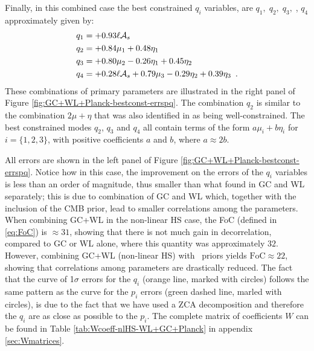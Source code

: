 Finally, in this combined case the best constrained $q_i$ variables, are $q_1,\;q_2,\;q_3,\;$, $q_4$ approximately given by:
\begin{equation} \label{eq:bestCombined-GCWLnonlinPlanck}
\begin{aligned}
	q_1  &= +0.93\ell \mathcal{A}_{s}\\            
	q_2  &= +0.84\mu_1 + 0.48\eta_1 \\ 
	q_3  &= +0.80\mu_2 - 0.26\eta_1 + 0.45 \eta_2\\
	q_4  &= +0.28\ell \mathcal{A}_{s} + 0.79\mu_3 - 0.29 \eta_2 + 0.39 \eta_3 \,\,\, .
\end{aligned}
\end{equation}
These combinations of primary parameters are illustrated in the right panel of Figure \ref{fig:GC+WL+Planck-bestconst-errspq}.
The combination $q_2$ is similar to the combination $2\mu+\eta$ that was also identified in \cite{planck_collaboration_planck_2016} as being well-constrained. The best constrained modes $q_2$, $q_3$ and $q_4$ all contain terms of the form $a\mu_i + b\eta_i$ for $i=\{1,2,3\}$, with positive coefficients $a$ and $b$, where $a \approx 2b$.

All errors are shown in the left panel of Figure \ref{fig:GC+WL+Planck-bestconst-errspq}. Notice how in this case, the improvement on the errors of the $q_i$ variables is less than an order of magnitude, thus smaller than what found in GC and WL separately; this is due to combination of GC and WL which, together with the inclusion of the CMB prior, lead to smaller correlations among the parameters. 
When combining GC+WL in the non-linear HS case, the FoC (defined in \ref{eq:FoC}) is $\approx 31$, 
showing that there is not much gain in decorrelation, compared to GC or WL alone, where this quantity was approximately $32$.
However, combining GC+WL (non-linear HS) with \planck\ priors yields $\textrm{FoC} \approx 22$, showing that correlations among
parameters are drastically reduced.
The fact that the curve of 1$\sigma$ errors for the $q_i$ (orange line, marked with circles) 
follows the same pattern as the curve for the $p_i$ errors (green dashed line, marled with circles), 
is due to the fact that we have used a ZCA decomposition and therefore the $q_i$ are as close as possible to the $p_i$.
The complete matrix of coefficients $W$ can be found in Table \ref{tab:Wcoeff-nlHS-WL+GC+Planck} in appendix \ref{sec:Wmatrices}.



